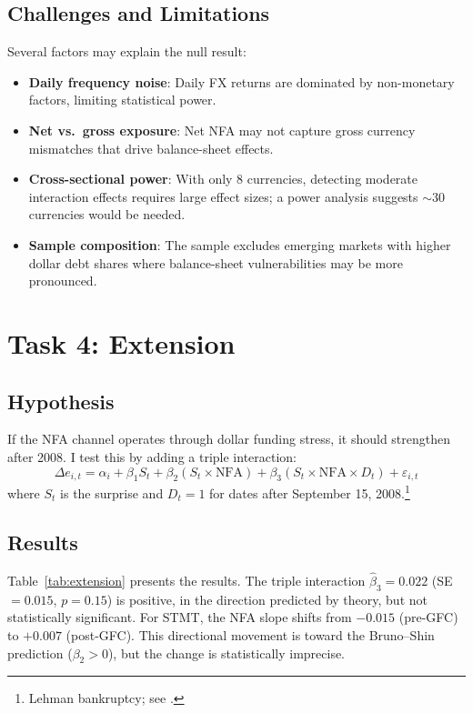 \documentclass[12pt]{article}
\begin{document}
\subsection*{Challenges and Limitations}

Several factors may explain the null result:
\begin{itemize}
    \item \textbf{Daily frequency noise}: Daily FX returns are dominated by non-monetary factors, limiting statistical power.
    \item \textbf{Net vs.\ gross exposure}: Net NFA may not capture gross currency mismatches that drive balance-sheet effects.
    \item \textbf{Cross-sectional power}: With only 8 currencies, detecting moderate interaction effects requires large effect sizes; a power analysis suggests $\sim$30 currencies would be needed.
    \item \textbf{Sample composition}: The sample excludes emerging markets with higher dollar debt shares where balance-sheet vulnerabilities may be more pronounced.
\end{itemize}

\section*{Task 4: Extension}

\subsection*{Hypothesis}

If the NFA channel operates through dollar funding stress, it should strengthen after 2008. I test this by adding a triple interaction:
\[
\Delta e_{i,t} = \alpha_i + \beta_1 S_t + \beta_2 (S_t \!\times\! \text{NFA}) + \beta_3 (S_t \!\times\! \text{NFA} \!\times\! D_t) + \varepsilon_{i,t}
\]
where $S_t$ is the surprise and $D_t = 1$ for dates after September 15, 2008.\footnote{Lehman bankruptcy; see \citet{bruno2015cross}.}

\subsection*{Results}

Table~\ref{tab:extension} presents the results. The triple interaction $\hat{\beta}_3 = 0.022$ (SE $= 0.015$, $p = 0.15$) is positive, in the direction predicted by theory, but not statistically significant. For STMT, the NFA slope shifts from $-0.015$ (pre-GFC) to $+0.007$ (post-GFC). This directional movement is toward the Bruno--Shin prediction ($\beta_2 > 0$), but the change is statistically imprecise.
\end{document}
